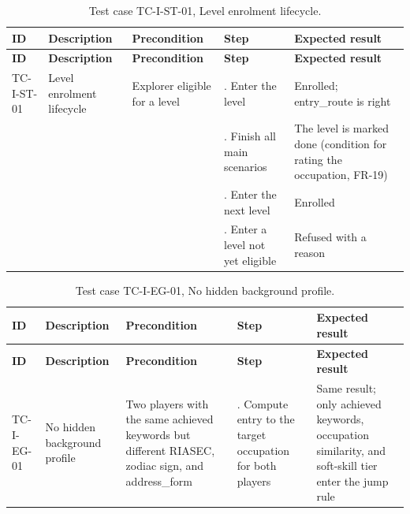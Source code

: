 {\small
\begin{longtable}{|>{\raggedright\arraybackslash}p{}|>{\raggedright\arraybackslash}p{}|>{\raggedright\arraybackslash}p{}|>{\raggedright\arraybackslash}p{}|>{\raggedright\arraybackslash}p{}|}
\caption{Test case TC-I-ST-01, Level enrolment lifecycle.} \\
\hline
\textbf{ID} & \textbf{Description} & \textbf{Precondition} & \textbf{Step} & \textbf{Expected result} \\ \hline
\endfirsthead
\hline
\textbf{ID} & \textbf{Description} & \textbf{Precondition} & \textbf{Step} & \textbf{Expected result} \\ \hline
\endhead
TC-I-ST-01 & Level enrolment lifecycle & Explorer eligible for a level & 1. Enter the level & Enrolled; entry\_route is right \\ \hline
 &  &  & 2. Finish all main scenarios & The level is marked done (condition for rating the occupation, FR-19) \\ \hline
 &  &  & 3. Enter the next level & Enrolled \\ \hline
 &  &  & 4. Enter a level not yet eligible & Refused with a reason \\ \hline
\end{longtable}
}

{\small
\begin{longtable}{|>{\raggedright\arraybackslash}p{}|>{\raggedright\arraybackslash}p{}|>{\raggedright\arraybackslash}p{}|>{\raggedright\arraybackslash}p{}|>{\raggedright\arraybackslash}p{}|}
\caption{Test case TC-I-EG-01, No hidden background profile.} \\
\hline
\textbf{ID} & \textbf{Description} & \textbf{Precondition} & \textbf{Step} & \textbf{Expected result} \\ \hline
\endfirsthead
\hline
\textbf{ID} & \textbf{Description} & \textbf{Precondition} & \textbf{Step} & \textbf{Expected result} \\ \hline
\endhead
TC-I-EG-01 & No hidden background profile & Two players with the same achieved keywords but different RIASEC, zodiac sign, and address\_form & 1. Compute entry to the target occupation for both players & Same result; only achieved keywords, occupation similarity, and soft-skill tier enter the jump rule \\ \hline
\end{longtable}
}

